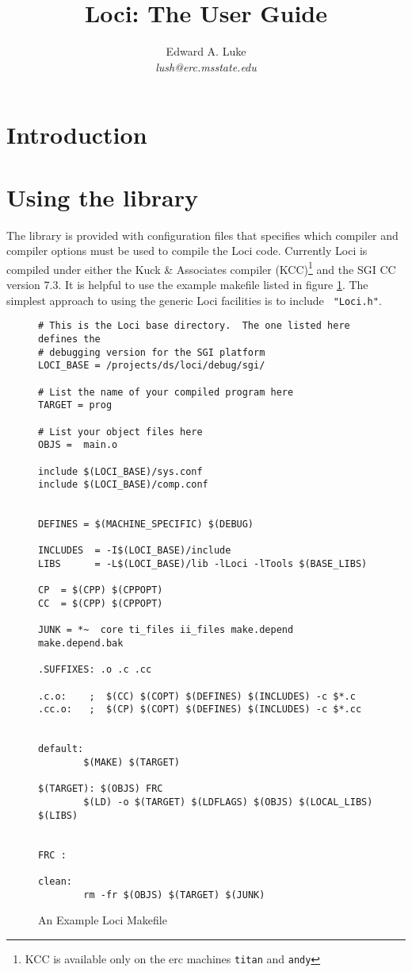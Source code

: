 \documentclass{article}
\begin{document}
\title{Loci: The User Guide}

\author{ Edward A. Luke \\
\it lush@erc.msstate.edu}

\maketitle

\section{Introduction}

\section{Using the library}

The library is provided with configuration files that specifies which
compiler and compiler options must be used to compile the Loci code.
Currently Loci is compiled under either the Kuck \& Associates compiler
(KCC)\footnote{KCC is available only on the erc machines {\tt titan}
  and {\tt andy}} and the SGI CC version 7.3.  It is helpful to use
the example makefile listed in figure \ref{makefile}.  The simplest
approach to using the generic Loci facilities is to include {\tt
  "Loci.h"}.

\begin{figure}[htbp]
\begin{verbatim}
# This is the Loci base directory.  The one listed here defines the
# debugging version for the SGI platform
LOCI_BASE = /projects/ds/loci/debug/sgi/

# List the name of your compiled program here
TARGET = prog

# List your object files here
OBJS =  main.o

include $(LOCI_BASE)/sys.conf
include $(LOCI_BASE)/comp.conf


DEFINES = $(MACHINE_SPECIFIC) $(DEBUG)

INCLUDES  = -I$(LOCI_BASE)/include 
LIBS      = -L$(LOCI_BASE)/lib -lLoci -lTools $(BASE_LIBS)

CP  = $(CPP) $(CPPOPT) 
CC  = $(CPP) $(CPPOPT)

JUNK = *~  core ti_files ii_files make.depend make.depend.bak

.SUFFIXES: .o .c .cc

.c.o:    ;  $(CC) $(COPT) $(DEFINES) $(INCLUDES) -c $*.c
.cc.o:   ;  $(CP) $(COPT) $(DEFINES) $(INCLUDES) -c $*.cc


default:
        $(MAKE) $(TARGET)

$(TARGET): $(OBJS) FRC
        $(LD) -o $(TARGET) $(LDFLAGS) $(OBJS) $(LOCAL_LIBS) $(LIBS)


FRC : 

clean:
        rm -fr $(OBJS) $(TARGET) $(JUNK)

\end{verbatim}
 \caption{An Example Loci Makefile}
 \label{makefile}
\end{figure}
\end{document}
